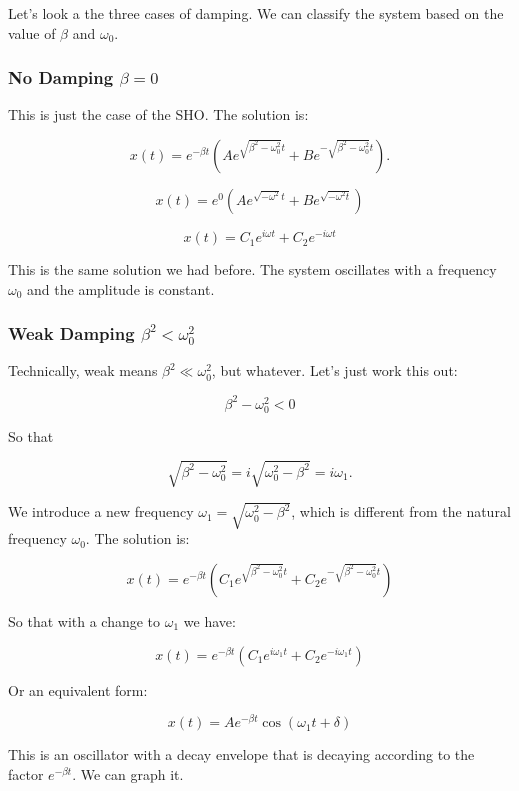 \documentclass[11pt]{article}
\begin{document}
Let's look a the three cases of damping. We can classify the system
based on the value of \(\beta\) and \(\omega_0\).

\subsubsection{\texorpdfstring{No Damping
\(\beta=0\)}{No Damping \textbackslash beta=0}}\label{no-damping-beta0}

This is just the case of the SHO. The solution is:

\[x(t) = e^{-\beta t}\left(A e^{\sqrt{\beta^2 - \omega_0^2} t} + B e^{-\sqrt{\beta^2 - \omega_0^2} t}\right).\]

\[x(t) = e^0 \left(A e^{\sqrt{-\omega^2} t} + B e^{\sqrt{-\omega^2 t}}\right)\]

\[x(t) = C_1 e^{i\omega t} + C_2 e^{-i\omega t}\]

This is the same solution we had before. The system oscillates with a
frequency \(\omega_0\) and the amplitude is constant.

\subsubsection{\texorpdfstring{Weak Damping
\(\beta^2 < \omega_0^2\)}{Weak Damping \textbackslash beta\^{}2 \textless{} \textbackslash omega\_0\^{}2}}\label{weak-damping-beta2-omega_02}

Technically, weak means \(\beta^2 \ll \omega_0^2\), but whatever. Let's
just work this out:

\[\beta^2 - \omega_0^2 < 0\]

So that

\[\sqrt{\beta^2 - \omega_0^2} = i\sqrt{\omega_0^2 - \beta^2} = i\omega_1.\]

We introduce a new frequency \(\omega_1 = \sqrt{\omega_0^2 - \beta^2}\),
which is different from the natural frequency \(\omega_0\). The solution
is:

\[x(t) = e^{-\beta t}\left(C_1 e^{\sqrt{\beta^2 - \omega_0^2} t} + C_2 e^{-\sqrt{\beta^2 - \omega_0^2} t}\right)\]

So that with a change to \(\omega_1\) we have:

\[x(t) = e^{-\beta t}\left(C_1 e^{i\omega_1 t} + C_2 e^{-i\omega_1 t}\right)\]

Or an equivalent form:

\[x(t) = Ae^{-\beta t}\cos(\omega_1 t + \delta)\]

This is an oscillator with a decay envelope that is decaying according
to the factor \(e^{-\beta t}\). We can graph it.
\end{document}

